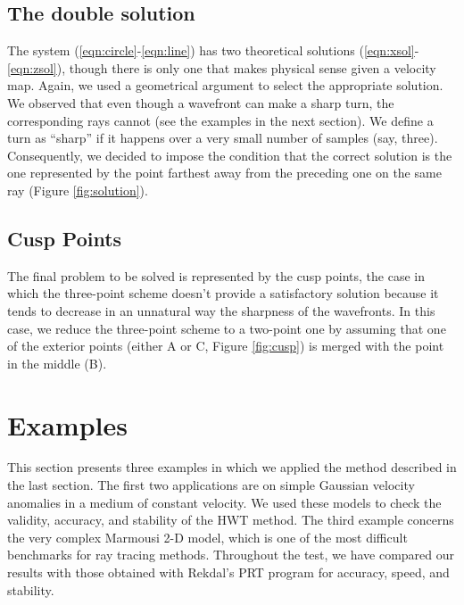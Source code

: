 \subsection{The double solution}

The system (\ref{eqn:circle}-\ref{eqn:line}) has two theoretical
solutions (\ref{eqn:xsol}-\ref{eqn:zsol}), though there is only one
that makes physical sense given a velocity map. Again, we used a
geometrical argument to select the appropriate solution. We observed 
that even though a wavefront can make a sharp turn, the corresponding
rays cannot (see the examples in the next section). We define a
turn as ``sharp'' if it happens over a very small number of samples (say,
three). Consequently, we decided to impose the condition that the correct
solution is the one represented by the point farthest away from the
preceding one on the same ray (Figure \ref{fig:solution}).

\subsection{Cusp Points}
   
The final problem to be solved is represented by the cusp
points, the case in which the three-point scheme doesn't provide a
satisfactory solution because it tends to decrease in an
unnatural way the sharpness of the wavefronts. In this case, we reduce
the three-point scheme to a two-point one by assuming that one of the
exterior points (either A or C, Figure \ref{fig:cusp}) is merged with
the point in the middle (B).


\section{Examples}

This section presents three examples in which we applied the method
described in the last section. The first two applications are on
simple Gaussian velocity anomalies in a medium of constant velocity. We used
these models to check the validity, accuracy, and stability of the HWT
method. The third example concerns the very complex Marmousi 2-D
model, which is one of the most difficult benchmarks for ray tracing
methods. Throughout the test, we have compared our results with those
obtained with Rekdal's PRT program \cite{Rekdal.sep.80.67} for accuracy,
speed, and stability.

